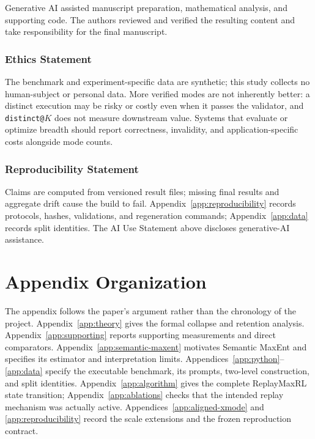 \documentclass{article}
\newcommand{\1}{\mathbf 1}
\theoremstyle{remark}
\theoremstyle{definition}
\theoremstyle{plain}
\begin{document}
Generative AI assisted manuscript preparation, mathematical analysis, and
supporting code. The authors reviewed and verified the resulting content and
take responsibility for the final manuscript.

\subsubsection*{Ethics Statement}

The benchmark and experiment-specific data are synthetic; this study collects
no human-subject or personal data. More verified modes are not inherently
better: a distinct execution may be risky or costly even when it passes the
validator, and \texttt{distinct@}$K$ does not measure downstream value. Systems
that evaluate or optimize breadth should report correctness, invalidity, and
application-specific costs alongside mode counts.

\subsubsection*{Reproducibility Statement}

Claims are computed from versioned result files; missing final results and aggregate drift cause the build to
fail. Appendix~\ref{app:reproducibility} records protocols, hashes, validations,
and regeneration commands; Appendix~\ref{app:data} records split identities.
The AI Use Statement above discloses generative-AI assistance.




\section*{Appendix Organization}
\label{app:organization}

The appendix follows the paper's argument rather than the chronology of the
project. Appendix~\ref{app:theory} gives the formal collapse and retention
analysis. Appendix~\ref{app:supporting} reports supporting measurements and
direct comparators. Appendix~\ref{app:semantic-maxent} motivates Semantic MaxEnt
and specifies its estimator and interpretation limits.
Appendices~\ref{app:python}--\ref{app:data} specify the executable benchmark,
its prompts, two-level construction, and split identities.
Appendix~\ref{app:algorithm} gives the complete ReplayMaxRL state transition;
Appendix~\ref{app:ablations} checks that the intended replay mechanism was
actually active. Appendices~\ref{app:aligned-xmode} and
\ref{app:reproducibility} record the scale extensions and the frozen
reproduction contract.
\end{document}
